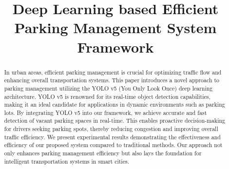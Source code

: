 \documentclass[conference]{IEEEtran}
\begin{document}
\title{Deep Learning based Efficient Parking Management System Framework}

\author{
 \and
{}
 \and
 
 \and
}

\maketitle
\thispagestyle{firstpage}

\begin{abstract}
In urban areas, efficient parking management is crucial for optimizing traffic flow and enhancing overall transportation systems. This paper introduces a novel approach to parking management utilizing the YOLO v5 (You Only Look Once) deep learning architecture. YOLO v5 is renowned for its real-time object detection capabilities, making it an ideal candidate for applications in dynamic environments such as parking lots. By integrating YOLO v5 into our framework, we achieve accurate and fast detection of vacant parking spaces in real-time. This enables proactive decision-making for drivers seeking parking spots, thereby reducing congestion and improving overall traffic efficiency. We present experimental results demonstrating the effectiveness and efficiency of our proposed system compared to traditional methods. Our approach not only enhances parking management efficiency but also lays the foundation for intelligent transportation systems in smart cities.
\end{abstract}
\end{document}
